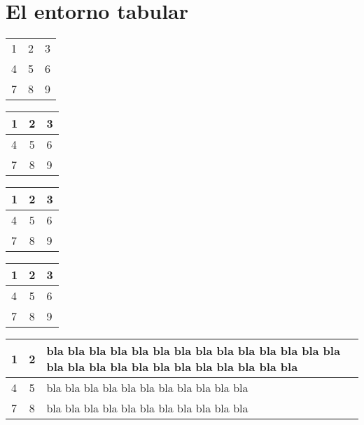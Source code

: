 \documentclass[11pt, a4paper]{article}
\begin{document}
\section{El entorno tabular}






\bigskip
%
\begin{tabular}{lcl}
1 & 2 & 3 \\ 
4 & 5 & 6 \\ 
7 & 8 & 9 
\end{tabular}  




\bigskip
%
\begin{tabular}{|l|c||l|} 
\hline 
1 & 2 & 3 \\ 
\hline\hline
4 & 5 & 6 \\ 
7 & 8 & 9 \\
\hline
\end{tabular}




\bigskip
%
\begin{tabular}{|l|c||l|} 
\hline 
1 & 2 & 3 \\ 
\hline\hline
4 & 5 & 6 \\ 
\cline{2-3}
7 & 8 & 9  \\
\cline{1-2}
\end{tabular}


\begin{tabular}{|l|c||l|} 
\hline 
1 & 2 & 3 \\ 
\hline\hline
4 & 5 & 6 \\ 
\cline{3-3} %
7 & 8 & 9  \\
\cline{1-2}
\end{tabular}








\bigskip
%
\begin{tabular}{|l|c||l|}
\hline
1 & 2 & bla bla bla bla bla bla bla bla bla bla bla bla bla bla bla bla bla bla bla bla  bla bla bla bla bla bla \\
\hline\hline
4 & 5 & bla bla bla bla bla bla bla bla bla bla bla  \\ 
7 & 8 & bla bla bla bla bla bla bla bla bla bla bla  \\ 
\hline
\end{tabular} 
\end{document}
